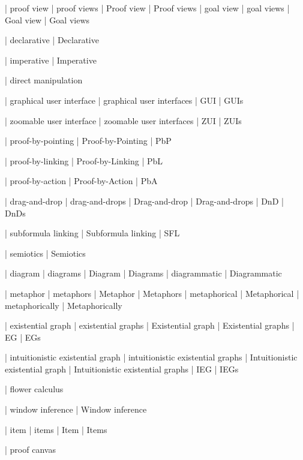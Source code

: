  | proof view
 | proof views
 | Proof view
 | Proof views
 | goal view
 | goal views
 | Goal view
 | Goal views

 | declarative
 | Declarative

 | imperative
 | Imperative

 | direct manipulation

 | graphical user interface
 | graphical user interfaces
 | GUI
 | GUIs

 | zoomable user interface
 | zoomable user interfaces
 | ZUI
 | ZUIs

 | proof-by-pointing
 | Proof-by-Pointing
 | PbP

 | proof-by-linking
 | Proof-by-Linking
 | PbL

 | proof-by-action
 | Proof-by-Action
 | PbA

 | drag-and-drop
 | drag-and-drops
 | Drag-and-drop
 | Drag-and-drops
 | DnD
 | DnDs

 | subformula linking
 | Subformula linking
 | SFL

 | semiotics
 | Semiotics

 | diagram
 | diagrams
 | Diagram
 | Diagrams
 | diagrammatic
 | Diagrammatic

 | metaphor
 | metaphors
 | Metaphor
 | Metaphors
 | metaphorical
 | Metaphorical
 | metaphorically
 | Metaphorically

 | existential graph
 | existential graphs
 | Existential graph
 | Existential graphs
 | EG
 | EGs

 | intuitionistic existential graph
 | intuitionistic existential graphs
 | Intuitionistic existential graph
 | Intuitionistic existential graphs
 | IEG
 | IEGs

 | flower calculus
 
 | window inference
 | Window inference


 | item
 | items
 | Item
 | Items

 | proof canvas

